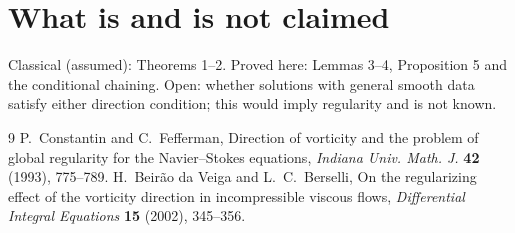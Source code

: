 \documentclass[11pt]{article}
\theoremstyle{definition}\newtheorem{definition}[theorem]{Definition}\newtheorem{remark}[theorem]{Remark}
\begin{document}
\section{What is and is not claimed}
Classical (assumed): Theorems 1--2. Proved here: Lemmas 3--4, Proposition 5 and the conditional chaining. Open: whether solutions with general smooth data satisfy either direction condition; this would imply regularity and is not known.

\begin{thebibliography}{9}
 P.~Constantin and C.~Fefferman, Direction of vorticity and the problem of global regularity for the Navier--Stokes equations, \emph{Indiana Univ. Math. J.} \textbf{42} (1993), 775--789.
 H.~Beir\~ao da Veiga and L.~C.~Berselli, On the regularizing effect of the vorticity direction in incompressible viscous flows, \emph{Differential Integral Equations} \textbf{15} (2002), 345--356.
\end{thebibliography}
\end{document}
